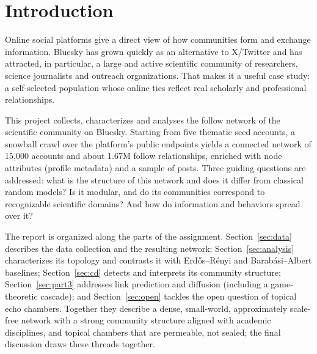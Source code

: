 \section{Introduction}
\label{sec:intro}

Online social platforms give a direct view of how communities form and exchange information. Bluesky has grown quickly as an alternative to X/Twitter and has attracted, in particular, a large and active scientific community of researchers, science journalists and outreach organizations. That makes it a useful case study: a self-selected population whose online ties reflect real scholarly and professional relationships.

This project collects, characterizes and analyses the follow network of the scientific community on Bluesky. Starting from five thematic seed accounts, a snowball crawl over the platform's public endpoints yields a connected network of 15{,}000 accounts and about 1.67M follow relationships, enriched with node attributes (profile metadata) and a sample of posts. Three guiding questions are addressed: what is the structure of this network and does it differ from classical random models? Is it modular, and do its communities correspond to recognizable scientific domains? And how do information and behaviors spread over it?

The report is organized along the parts of the assignment. Section~\ref{sec:data} describes the data collection and the resulting network; Section~\ref{sec:analysis} characterizes its topology and contrasts it with Erd\H{o}s--R\'enyi and Barab\'asi--Albert baselines; Section~\ref{sec:cd} detects and interprets its community structure; Section~\ref{sec:part3} addresses link prediction and diffusion (including a game-theoretic cascade); and Section~\ref{sec:open} tackles the open question of topical echo chambers. Together they describe a dense, small-world, approximately scale-free network with a strong community structure aligned with academic disciplines, and topical chambers that are permeable, not sealed; the final discussion draws these threads together.
